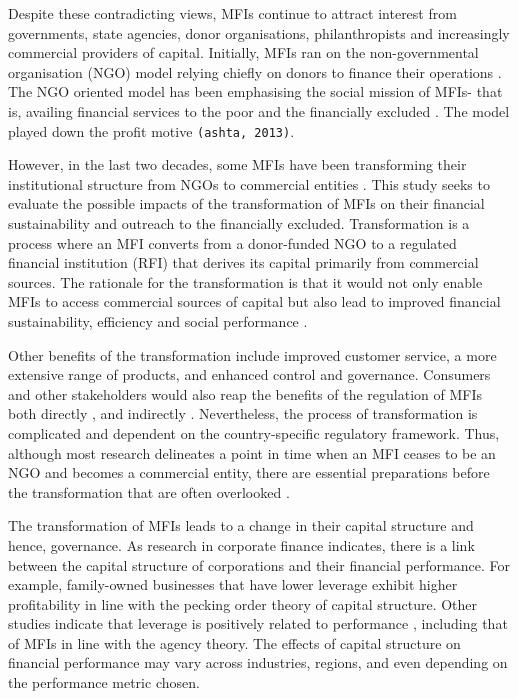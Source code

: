 \documentclass[a4paper,nobind]{templates/ociamthesis}
\begin{document}
Despite these contradicting views, MFIs continue to attract interest from governments, state agencies, donor organisations, philanthropists and increasingly commercial providers of capital. Initially, MFIs ran on the non-governmental organisation (NGO) model relying chiefly on donors to finance their operations \autocite{d2017ngos}. The NGO oriented model has been emphasising the social mission of MFIs- that is, availing financial services to the poor and the financially excluded \autocite{ashta2012compartamos}. The model played down the profit motive \texttt{(ashta,\ 2013)}.

However, in the last two decades, some MFIs have been transforming their institutional structure from NGOs to commercial entities \autocite{d2017ngos}. This study seeks to evaluate the possible impacts of the transformation of MFIs on their financial sustainability and outreach to the financially excluded. Transformation is a process where an MFI converts from a donor-funded NGO to a regulated financial institution (RFI) that derives its capital primarily from commercial sources. The rationale for the transformation is that it would not only enable MFIs to access commercial sources of capital but also lead to improved financial sustainability, efficiency and social performance \autocite{louis2013financial}.

Other benefits of the transformation include improved customer service, a more extensive range of products, and enhanced control and governance\autocite{srnec2008transformation}. Consumers and other stakeholders would also reap the benefits of the regulation of MFIs both directly \textcite{meagher2006microfinance}, and indirectly \autocite{hartarska2007regulated}. Nevertheless, the process of transformation is complicated and dependent on the country-specific regulatory framework. Thus, although most research delineates a point in time when an MFI ceases to be an NGO and becomes a commercial entity, there are essential preparations before the transformation that are often overlooked \autocite{d2017ngos}.

The transformation of MFIs leads to a change in their capital structure and hence, governance. As research in corporate finance indicates, there is a link between the capital structure of corporations and their financial performance. For example, family-owned businesses that have lower leverage exhibit higher profitability \autocite{hamid2015capital} in line with the pecking order theory of capital structure. Other studies indicate that leverage is positively related to performance \autocite{fosu2013capital,berger2006capital}, including that of MFIs \autocite{kar2012does} in line with the agency theory. The effects of capital structure on financial performance may vary across industries, regions, and even depending on the performance metric chosen.
\end{document}
